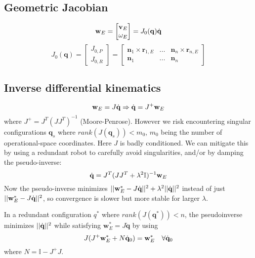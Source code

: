 \documentclass[a4paper, 8pt]{extarticle}
\begin{document}
\begin{multicols*}{3}
\subsection{Geometric Jacobian}
$$\textbf{w}_E = \begin{bmatrix} \textbf v_E \\ \omega_E \end{bmatrix} = J_0(\mathbf q)\dot{\mathbf q}$$
$$J_0(\mathbf q) = \begin{bmatrix} 
J_{0,P} \\ J_{0,R} \end{bmatrix} = 
\begin{bmatrix}
\mathbf n_1 \times \mathbf r_{1,E} & ... & \mathbf n_n \times \mathbf r_{n,E} \\
\mathbf n_1 & ... & \mathbf n_n \end{bmatrix}$$



\subsection{Inverse differential kinematics}
$$\textbf{w}_E = J\dot{\mathbf q} \Rightarrow
\dot{\mathbf q} = J^+ \textbf w_E$$
where $J^+ = J^T(JJ^T)^{-1}$ (Moore-Penrose). However we risk encountering singular configurations $\mathbf q_s$ where $rank(J(\mathbf q_s)) < m_0$, $m_0$ being the number of operational-space coordinates. Here $J$ is badly conditioned. We can mitigate this by using a redundant robot to carefully avoid singularities, and/or by damping the pseudo-inverse:
$$\dot{\mathbf q} = J^T(JJ^T + \lambda^2\mathbb{I})^{-1} \textbf w_E$$
Now the pseudo-inverse minimizes $||\textbf w_E^* - J\dot{\textbf q}||^2 + \lambda^2||\dot{\mathbf q}||^2$ instead of just $||\textbf w_E^* - J\dot{\textbf q}||^2$, so convergence is slower but more stable for larger $\lambda$.

In a redundant configuration $q^*$ where $rank(J(\mathbf q^*)) < n$, the pseudoinverse minimizes $||\dot{\textbf q}||^2$ while satisfying $\textbf{w}_E^* = J\dot{\mathbf q}$ by using
$$J(J^+\textbf w_E^* + N\dot{\mathbf q}_0) = \textbf w_E^* \quad \forall\dot{\mathbf q}_0$$
where $N = \mathbb I - J^+J$.




\end{multicols*}
\end{document}
